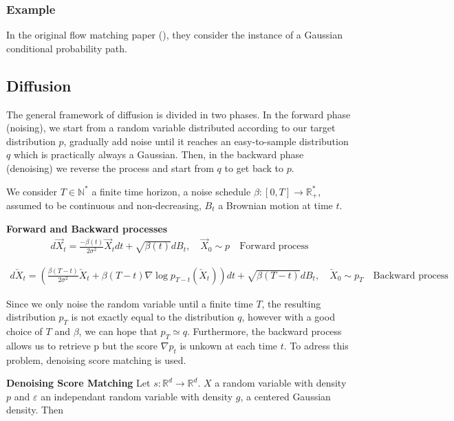 \documentclass{article}
\begin{document}
\subsubsection{Example}
In the original flow matching paper (\cite{lipman2023flowmatchinggenerativemodeling}), they consider the instance of a Gaussian conditional probability path.

\subsection{Diffusion}
The general framework of diffusion is divided in two phases. In the forward phase (noising), we start from a random variable distributed according to our target distribution \( p \), gradually add noise until it reaches an easy-to-sample distribution \(q\) which is practically always a Gaussian. Then, in the backward phase (denoising) we reverse the process and start from \(q\) to get back to \(p\). 

\bigskip

We consider \(T\in\mathbb{N}^{*}\) a finite time horizon, a noise schedule \(\beta:[0,T]\rightarrow \mathbb{R}_{+}^{*}\), assumed to be continuous and non-decreasing, \(B_t\) a Brownian motion at time \(t\).

\textbf{Forward and Backward processes}
\begin{align}
    d\overrightarrow{X}_t = \frac{-\beta(t)}{2\sigma^2}\overrightarrow{X}_t dt + \sqrt{\beta(t)}dB_t, \quad \overrightarrow{X}_0\sim p 
    \quad \text{Forward process}
\end{align} 

\begin{align}
    d\overleftarrow{X}_t=\left(  \frac{\beta(T-t)}{2\sigma^2}\overleftarrow{X}_t+\beta(T-t)\nabla\log p_{T-t}\left(\overleftarrow{X}_t \right)  \right)dt + \sqrt{\beta(T-t)}dB_t, \quad \overleftarrow{X}_0\sim p_T \quad \text{Backward process}
\end{align}

Since we only noise the random variable until a finite time \(T\), the resulting distribution \(p_T\) is not exactly equal to the distribution \(q\), however with a good choice of \(T\) and \(\beta\), we can hope that \(p_T\simeq q\). Furthermore, the backward process allows us to retrieve p but the score \(\nabla p_t\) is unkown at each time \(t\). To adress this problem, denoising score matching is used.  

\bigskip
\textbf{Denoising Score Matching} \newline
Let \(s:\mathbb{R}^d\rightarrow\mathbb{R}^d\). \(X\) a random variable with density \(p\) and \(\varepsilon\) an independant random variable with density \(g\), a centered Gaussian density. Then 
\end{document}
